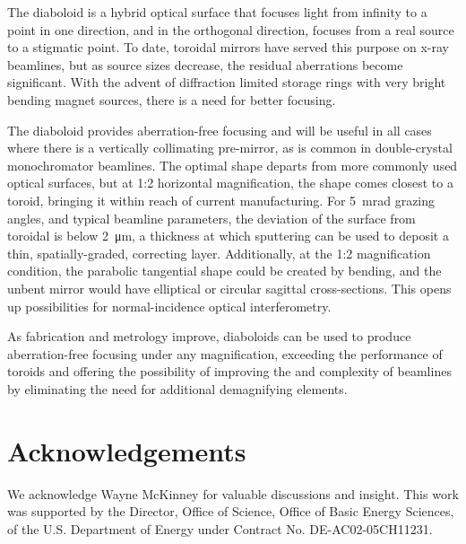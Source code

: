 \documentclass{iucr}       %
\begin{document}
The diaboloid is a hybrid optical surface that focuses light from infinity to a point in one direction, and in the orthogonal direction, focuses from a real source to a stigmatic point. To date, toroidal mirrors have served this purpose on x-ray beamlines, but as source sizes decrease, the residual aberrations become significant. With the advent of diffraction limited storage rings with very bright bending magnet sources, there is a need for better focusing. 

The diaboloid provides aberration-free focusing and will be useful in all cases where there is a vertically collimating pre-mirror, as is common in double-crystal monochromator beamlines. The optimal shape departs from more commonly used optical surfaces, but at 1:2 horizontal magnification, the shape comes closest to a toroid, bringing it within reach of current manufacturing.
For \SI{5}{\milli\radian} grazing angles, and typical beamline parameters, the deviation of the surface from toroidal is below \SI{2}{\micro\meter}, a thickness at which sputtering can be used to deposit a thin, spatially-graded, correcting layer. Additionally, at the 1:2 magnification condition, the parabolic tangential shape could be created by bending, and the unbent mirror would have elliptical or circular sagittal cross-sections. This opens up possibilities for normal-incidence optical interferometry.

As fabrication and metrology improve, diaboloids can be used to produce aberration-free focusing under any magnification, exceeding the performance of toroids and offering the possibility of improving the  and complexity of beamlines by eliminating the need for additional demagnifying elements. 




\vspace{5mm}
\section{Acknowledgements}    
 
We acknowledge Wayne McKinney for valuable discussions and insight.
This work was supported by the Director, Office of Science, Office of Basic Energy Sciences, of the U.S. Department of Energy under Contract No. DE-AC02-05CH11231.
\end{document}
